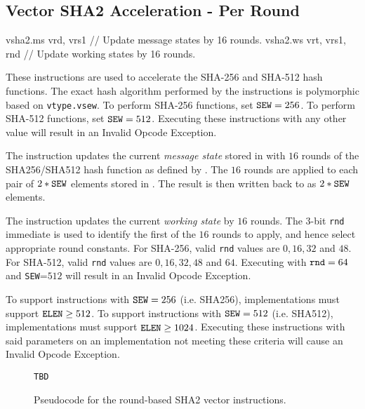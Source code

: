 
\subsection{Vector SHA2 Acceleration - Per Round}
\label{sec:vector:sha2:per-round}

\begin{cryptoisa}
vsha2.ms vrd, vrs1      // Update message states by 16 rounds.
vsha2.ws vrt, vrs1, rnd // Update working states by 16 rounds.
\end{cryptoisa}

These instructions are used to accelerate the SHA-256 and SHA-512
hash functions.
The exact hash algorithm performed by the instructions is
polymorphic based on {\tt vtype.vsew}.
To perform SHA-256 functions, set ${\tt SEW}=256$.
To perform SHA-512 functions, set ${\tt SEW}=512$.
Executing these instructions with any other \SEW value will
result in an Invalid Opcode Exception.

The  instruction updates the current {\em message state}
stored in  with $16$ rounds of the SHA256/SHA512 hash function
as defined by \SEW.
The $16$ rounds are applied to each pair of $2*{\tt SEW}$
elements stored in .
The result is then written back to \vrd as $2*{\tt SEW}$ elements.

The  instruction updates the current {\em working state}
by $16$ rounds.
The $3$-bit {\tt rnd} immediate is used to identify the first of
the $16$ rounds to apply, and hence select appropriate round constants.
For SHA-256, valid {\tt rnd} values are $0, 16, 32$   and $48$.
For SHA-512, valid {\tt rnd} values are $0, 16, 32, 48$ and $64$.
Executing  with
${\tt rnd}=64$ 
and
{\tt SEW}=$512$
will result in an Invalid Opcode Exception.


To support  instructions with ${\tt SEW}=256$ (i.e. SHA256),
implementations must support ${\tt ELEN} \ge 512$.
To support  instructions with ${\tt SEW}=512$ (i.e. SHA512),
implementations must support ${\tt ELEN} \ge 1024$.
Executing these instructions with said parameters on an implementation
not meeting these criteria will cause an Invalid Opcode Exception.

\begin{figure}[h]
\begin{lstlisting}[language=pseudo]
TBD
\end{lstlisting}
\caption{Pseudocode for the round-based SHA2 vector instructions.}
\label{fig:pseudo:sha:per-round}
\end{figure}

